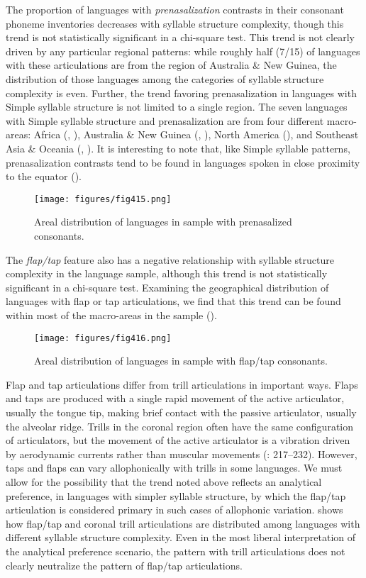   The proportion of languages with \textit{prenasalization} contrasts in their consonant phoneme inventories decreases with syllable structure complexity, though this trend is not statistically significant in a chi-square test. This trend is not clearly driven by any particular regional patterns: while roughly half (7/15) of languages with these articulations are from the region of Australia \& New Guinea, the distribution of those languages among the categories of syllable structure complexity is even. Further, the trend favoring prenasalization in languages with Simple syllable structure is not limited to a single region. The seven languages with Simple syllable structure and prenasalization are from four different macro-areas: Africa (, ), Australia \& New Guinea (, ), North America (), and Southeast Asia \& Oceania (, ). It is interesting to note that, like Simple syllable patterns, prenasalization contrasts tend to be found in languages spoken in close proximity to the equator ().


\begin{figure}  
\texttt{[image: figures/fig415.png]}
\caption{\label{fig:4.15}Areal distribution of languages in sample with prenasalized consonants.}
\end{figure}

  The \textit{flap/tap} feature also has a negative relationship with syllable structure complexity in the language sample, although this trend is not statistically significant in a chi-square test. Examining the geographical distribution of languages with flap or tap articulations, we find that this trend can be found within most of the macro-areas in the sample ().


\begin{figure}  
\texttt{[image: figures/fig416.png]}
\caption{\label{fig:4.16}Areal distribution of languages in sample with flap/tap consonants.}
\end{figure}

  Flap and tap articulations differ from trill articulations in important ways. Flaps and taps are produced with a single rapid movement of the active articulator, usually the tongue tip, making brief contact with the passive articulator, usually the alveolar ridge. Trills in the coronal region often have the same configuration of articulators, but the movement of the active articulator is a vibration driven by aerodynamic currents rather than muscular movements (\citealt{LadefogedMaddieson1996}: 217--232). However, taps and flaps can vary allophonically with trills in some languages. We must allow for the possibility that the trend noted above reflects an analytical preference, in languages with simpler syllable structure, by which the flap/tap articulation is considered primary in such cases of allophonic variation.  shows how flap/tap and coronal trill articulations are distributed among languages with different syllable structure complexity. Even in the most liberal interpretation of the analytical preference scenario, the pattern with trill articulations does not clearly neutralize the pattern of flap/tap articulations.

